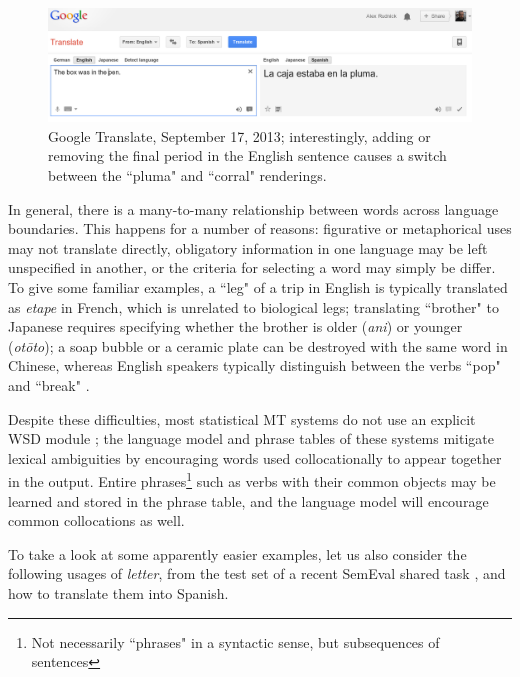 \begin{figure}
  \includegraphics[width=12cm]{box-in-pen.png}
  \caption{Google Translate, September 17, 2013; interestingly, adding or
  removing the final period in the English sentence causes a switch between the
  ``pluma" and ``corral" renderings.}
  \label{fig:box-in-pen}
\end{figure}

In general, there is a many-to-many relationship between words across language
boundaries.
This happens for a number of reasons: figurative or metaphorical uses may not
translate directly,
obligatory information in one language may be left unspecified in another,
or the criteria for selecting a word may simply be differ.
To give some familiar examples, a ``leg" of a trip in English is typically
translated as \emph{etape} in French, which is unrelated to biological legs;
translating ``brother" to Japanese requires specifying whether the brother is
older (\emph{ani}) or younger (\emph{ot\=oto});
a soap bubble or a ceramic plate can be destroyed with the same word in
Chinese, whereas English speakers typically distinguish between the verbs
``pop" and ``break" \cite{majid2007semantic}.

Despite these difficulties, most statistical MT systems do not use an explicit
WSD module \cite{wsdchap3}; the language model and phrase tables of these
systems mitigate lexical ambiguities by encouraging words used collocationally
to appear together in the output. Entire phrases\footnote{Not necessarily
``phrases" in a syntactic sense, but subsequences of sentences} such as verbs
with their common objects may be learned and stored in the phrase table, and
the language model will encourage common collocations as well.

To take a look at some apparently easier examples, let us also consider the
following usages of \emph{letter}, from the test set of a recent SemEval shared
task \cite{task10}, and how to translate them into Spanish.

\label{sent:carta}
\label{sent:letra}

